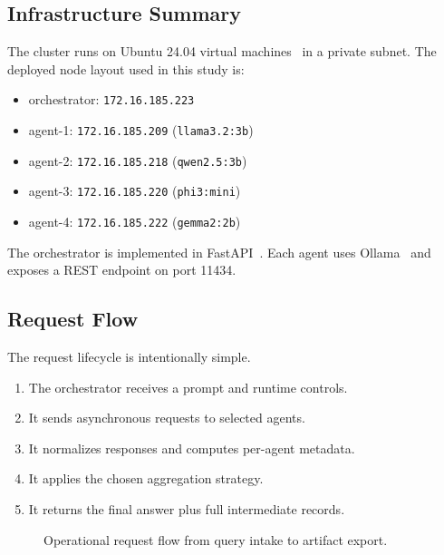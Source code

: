 \documentclass[conference]{IEEEtran}
\begin{document}
\subsection{Infrastructure Summary}
The cluster runs on Ubuntu 24.04 virtual machines~\cite{ubuntu2404} in a private subnet. The deployed node layout used in this study is:
\begin{itemize}
  \item orchestrator: \texttt{172.16.185.223}
  \item agent-1: \texttt{172.16.185.209} (\texttt{llama3.2:3b})
  \item agent-2: \texttt{172.16.185.218} (\texttt{qwen2.5:3b})
  \item agent-3: \texttt{172.16.185.220} (\texttt{phi3:mini})
  \item agent-4: \texttt{172.16.185.222} (\texttt{gemma2:2b})
\end{itemize}

The orchestrator is implemented in FastAPI~\cite{fastapi}. Each agent uses Ollama~\cite{ollama} and exposes a REST endpoint on port 11434.

\subsection{Request Flow}
The request lifecycle is intentionally simple.
\begin{enumerate}
  \item The orchestrator receives a prompt and runtime controls.
  \item It sends asynchronous requests to selected agents.
  \item It normalizes responses and computes per-agent metadata.
  \item It applies the chosen aggregation strategy.
  \item It returns the final answer plus full intermediate records.
\end{enumerate}

\begin{figure}[t]
  \centering
  \caption{Operational request flow from query intake to artifact export.}
  \label{fig:flow}
\end{figure}
\end{document}
